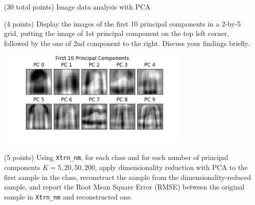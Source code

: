 \documentclass[12pt]{article}
\begin{document}
\begin{question}{(30 total points) Image data analysis with PCA}
\begin{subquestion}
   \end{subquestion}

   \begin{subquestion}{(4 points)
      Display the images of the first 10 principal components in
      a 2-by-5 grid, putting the image of 1st principal component on
      the top left corner, followed by the one of 2nd component to the right.
      Discuss your findings briefly.
     } \label{Q1.disp.pca}
   

      \begin{answerbox}{35em}
         \begin{center}
            \includegraphics[width=0.7\textwidth]{results/1_5.png}
        \end{center}
      \end{answerbox}
  


   \end{subquestion}

   \begin{subquestion}{(5 points)
       Using \texttt{Xtrn\_nm}, 
       for each class and for each number of principal components $K =
       5, 20, 50, 200$, apply dimensionality reduction with PCA to the
       first sample in the class, reconstruct the sample from the
       dimensionality-reduced sample, and 
       report the Root Mean Square Error (RMSE) between the
       original sample in {\tt Xtrn\_nm} and reconstructed one.
     } \label{Q1.6}

     


\end{subquestion}
\end{question}
\end{document}
